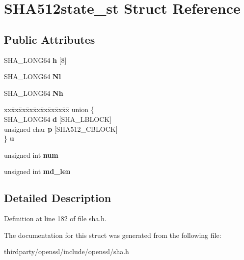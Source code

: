 \hypertarget{struct_s_h_a512state__st}{}\section{S\+H\+A512state\+\_\+st Struct Reference}
\label{struct_s_h_a512state__st}
\subsection*{Public Attributes}
\begin{DoxyCompactItemize}
\item 
\mbox{\label{struct_s_h_a512state__st_a883844a48a6badf07ab8d5a3b42fa0f6}} 
S\+H\+A\+\_\+\+L\+O\+N\+G64 {\bfseries h} \mbox{[}8\mbox{]}
\item 
\mbox{\label{struct_s_h_a512state__st_a8adc6d1037d156b3adcb14773fa8fe90}} 
S\+H\+A\+\_\+\+L\+O\+N\+G64 {\bfseries Nl}
\item 
\mbox{\label{struct_s_h_a512state__st_acfe2405c1f495e7fe24c837ef4a7a9e1}} 
S\+H\+A\+\_\+\+L\+O\+N\+G64 {\bfseries Nh}
\item 
\mbox{\label{struct_s_h_a512state__st_af964121cc9e33b3c6b031f62397bcb26}} 
\begin{tabbing}
xx\=xx\=xx\=xx\=xx\=xx\=xx\=xx\=xx\=\kill
union \{\\
\>SHA\_LONG64 {\bfseries d} \mbox{[}SHA\_LBLOCK\mbox{]}\\
\>unsigned char {\bfseries p} \mbox{[}SHA512\_CBLOCK\mbox{]}\\
\} {\bfseries u}\\

\end{tabbing}\item 
\mbox{\label{struct_s_h_a512state__st_ae3ba23906ed2416ed3fae1765cf3c0f0}} 
unsigned int {\bfseries num}
\item 
\mbox{\label{struct_s_h_a512state__st_ac2699bd40af3279042712d23b79fb3db}} 
unsigned int {\bfseries md\+\_\+len}
\end{DoxyCompactItemize}


\subsection{Detailed Description}


Definition at line 182 of file sha.\+h.



The documentation for this struct was generated from the following file\+:\begin{DoxyCompactItemize}
\item 
thirdparty/openssl/include/openssl/sha.\+h\end{DoxyCompactItemize}

